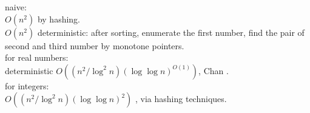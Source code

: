 \documentclass{article}
\begin{document}
naive:\\
$O(n^2)$ by hashing.\\
$O(n^2)$ deterministic: after sorting, enumerate the first number, find the pair of second and third number by monotone pointers.\\


for real numbers:\\
deterministic $O((n^2/\log^2 n)(\log\log n)^{O(1)})$, Chan \cite{chan2018more}.\\

for integers:\\
$O((n^2/\log^2 n)(\log\log n)^2)$ \cite{baran2008subquadratic}, via hashing techniques.\\






\end{document}
